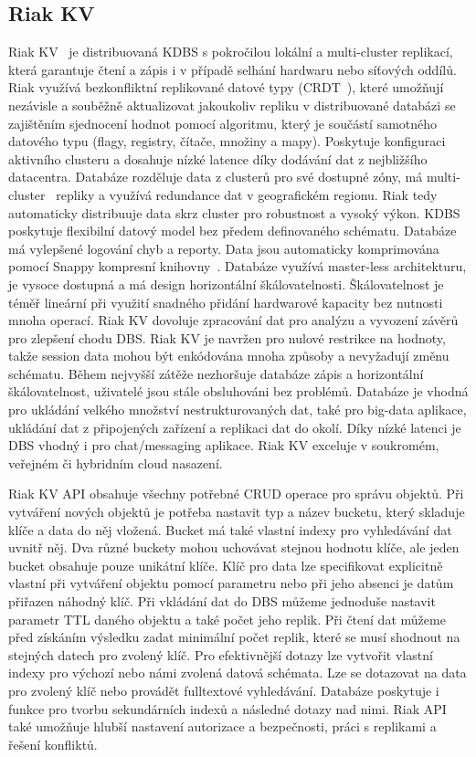 \documentclass[czech,master,dept460,male,csharp,cpdeclaration]{diploma}
\begin{document}
	\subsection{Riak KV} \label{lab-riak}
	
	Riak KV~\cite{riak} je distribuovaná KDBS s pokročilou lokální a multi-cluster replikací, která garantuje čtení a zápis i v případě selhání hardwaru nebo síťových oddílů. Riak využívá bezkonfliktní replikované datové typy (CRDT~\cite{crdt}), které umožňují nezávisle a souběžně aktualizovat jakoukoliv repliku v distribuované databázi se zajištěním sjednocení hodnot pomocí algoritmu, který je součástí samotného datového typu (flagy, registry, čítače, množiny a mapy). Poskytuje konfiguraci aktivního clusteru a dosahuje nízké latence díky dodávání dat z nejbližšího datacentra. Databáze rozděluje data z clusterů pro své dostupné zóny, má multi-cluster~\cite{multicluster} repliky a využívá redundance dat v geografickém regionu. Riak tedy automaticky distribuuje data skrz cluster pro robustnost a vysoký výkon. KDBS poskytuje flexibilní datový model bez předem definovaného schématu. Databáze má vylepšené logování chyb a reporty. Data jsou automaticky komprimována pomocí Snappy kompresní knihovny~\cite{snappy}. Databáze využívá master-less architekturu, je vysoce dostupná a má design horizontální škálovatelnosti. Škálovatelnost je téměř lineární při využití snadného přidání hardwarové kapacity bez nutnosti mnoha operací. Riak KV dovoluje zpracování dat pro analýzu a vyvození závěrů pro zlepšení chodu DBS. Riak KV je navržen pro nulové restrikce na hodnoty, takže session data mohou být enkódována mnoha způsoby a nevyžadují změnu schématu. Během nejvyšší zátěže nezhoršuje databáze zápis a horizontální škálovatelnost, uživatelé jsou stále obsluhováni bez problémů. Databáze je vhodná pro ukládání velkého množství nestrukturovaných dat, také pro big-data aplikace, ukládání dat z připojených zařízení a replikaci dat do okolí. Díky nízké latenci je DBS vhodný i pro chat/messaging aplikace. Riak KV exceluje v soukromém, veřejném či hybridním cloud nasazení.
	
	Riak KV API obsahuje všechny potřebné CRUD operace pro správu objektů. Při vytváření nových objektů je potřeba nastavit typ a název bucketu, který skladuje klíče a data do něj vložená. Bucket má také vlastní indexy pro vyhledávání dat uvnitř něj. Dva různé buckety mohou uchovávat stejnou hodnotu klíče, ale jeden bucket obsahuje pouze unikátní klíče. Klíč pro data lze specifikovat explicitně vlastní při vytváření objektu pomocí parametru nebo při jeho absenci je datům přiřazen náhodný klíč. Při vkládání dat do DBS můžeme jednoduše nastavit parametr TTL daného objektu a také počet jeho replik. Při čtení dat můžeme před získáním výsledku zadat minimální počet replik, které se musí shodnout na stejných datech pro zvolený klíč. Pro efektivnější dotazy lze vytvořit vlastní indexy pro výchozí nebo námi zvolená datová schémata. Lze se dotazovat na data pro zvolený klíč nebo provádět fulltextové vyhledávání. Databáze poskytuje i funkce pro tvorbu sekundárních indexů a následné dotazy nad nimi. Riak API také umožňuje hlubší nastavení autorizace a bezpečnosti, práci s replikami a řešení konfliktů.
	
\end{document}
